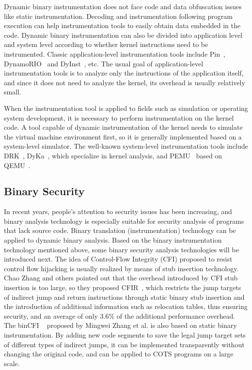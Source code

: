 Dynamic binary instrumentation does not face code and data obfuscation issues like static instrumentation.
Decoding and instrumentation following program execution can help instrumentation tools to easily obtain data embedded in the code.
Dynamic binary instrumentation can also be divided into application level and system level according to whether kernel instructions need to be instrumented.
Classic application-level instrumentation tools include Pin~\cite{DBLP:conf/pldi/LukCMPKLWRH05}, DynamoRIO~\cite{DBLP:conf/vee/BrueningZA12} and DyInst~\cite{DBLP:journals/ijhpca/BuckH00}, etc.
The usual goal of application-level instrumentation tools is to analyze only the instructions of the application itself, and since it does not need to analyze the kernel, its overhead is usually relatively small.

When the instrumentation tool is applied to fields such as simulation or operating system development, it is necessary to perform instrumentation on the kernel code.
A tool capable of dynamic instrumentation of the kernel needs to simulate the virtual machine environment first, so it is generally implemented based on a system-level simulator.
The well-known system-level instrumentation tools include DRK~\cite{DBLP:conf/asplos/FeinerBG12}, DyKa~\cite{DBLP:conf/icuimc/LeeJKE12}, which specialize in kernel analysis, and PEMU~\cite{DBLP:conf/vee/ZengFL15} based on QEMU~\cite{DBLP:conf/usenix/Bellard05}.

\subsection{Binary Security}
In recent years, people's attention to security issues has been increasing, and binary analysis technology is especially suitable for security analysis of programs that lack source code.
Binary translation (instrumentation) technology can be applied to dynamic binary analysis.
Based on the binary instrumentation technology mentioned above, some binary security analysis technologies will be introduced next.
The idea of Control-Flow Integrity (CFI) proposed to resist control flow hijacking is usually realized by means of stub insertion technology.
Chao Zhang and others pointed out that the overhead introduced by CFI stub insertion is too large, so they proposed CFIR~\cite{DBLP:conf/sp/ZhangWCDSMSZ13}, which restricts the jump targets of indirect jump and return instructions through static binary stub insertion and the introduction of additional information such as relocation tables, thus ensuring security, and an average of only 3.6\% of the additional performance overhead.
The binCFI ~\cite{DBLP:conf/acsac/ZhangS15} proposed by Mingwei Zhang et al. is also based on static binary instrumentation.
By adding new code segments to save the legal jump target sets of different types of indirect jumps, it can be implemented transparently without changing the original code, and can be applied to COTS programs on a large scale.

